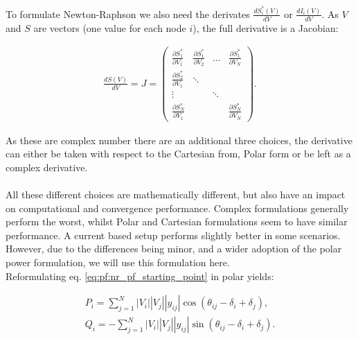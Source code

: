 To formulate Newton-Raphson we also need the derivates $\frac{dS^*_i(V)}{dV}$ or $\frac{dI_i(V)}{dV}$. As $V$ and $S$ are vectors
(one value for each node $i$), the full derivative is a Jacobian:

\begin{align}
    \frac{dS(V)}{dV} = J = 
    \begin{pmatrix}
        \frac{\partial S^*_1}{\partial V_1} & \frac{\partial S^*_1}{\partial V_2} & \dots  & \frac{\partial S^*_1}{\partial V_N}\\
        \frac{\partial S^*_2}{\partial V_1} & \ddots                              &        &                                    \\
        \vdots                              &                                     & \ddots &                                    \\
        \frac{\partial S^*_N}{\partial V_1} &                                     &        & \frac{\partial S^*_N}{\partial V_N}
    \end{pmatrix}.
\end{align}

As these are complex number there are an additional three choices, the derivative can either be taken
with respect to the Cartesian from, Polar form or be left as a complex derivative.\\
\\
All these different choices are mathematically different, but also have an impact
on computational and convergence
performance\autocite{newton_raphson_setup_choices}. Complex formulations
generally perform the worst, whilst Polar and
Cartesian formulations seem to have similar performance.
A current based setup performs slightly better in some 
scenarios\autocite{newton_raphson_setup_choices}.
However, due to the differences being minor, and a 
wider adoption of the polar power formulation, we will use this formulation here.\\

Reformulating eq. \ref{eq:pf:nr_pf_starting_point} in polar yields:

\begin{equation}
    \begin{split}
    P_i = \sum_{j=1}^N |V_i||V_j||y_{ij}| \cos(\theta_{ij} - \delta_i + \delta_j),\\
    Q_i = -\sum_{j=1}^N |V_i||V_j||y_{ij}| \sin(\theta_{ij} - \delta_i + \delta_j).
    \end{split}
    \label{eq:pf:nr_pf_pq}
\end{equation}

